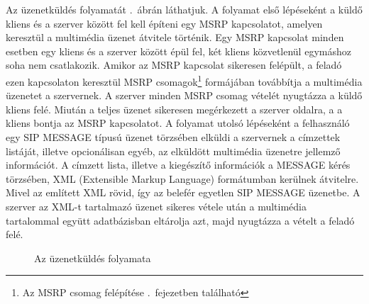 Az üzenetküldés folyamatát .~ábrán láthatjuk. A folyamat első lépéseként a küldő kliens és a szerver között fel kell építeni egy MSRP kapcsolatot, amelyen keresztül a multimédia üzenet átvitele történik. Egy MSRP kapcsolat minden esetben egy kliens és a szerver között épül fel, két kliens közvetlenül egymáshoz soha nem csatlakozik. Amikor az MSRP kapcsolat sikeresen felépült, a feladó ezen kapcsolaton keresztül MSRP csomagok\footnote{Az MSRP csomag felépítése .~fejezetben található} formájában továbbítja a multimédia üzenetet a szervernek. A szerver minden MSRP csomag vételét nyugtázza a küldő kliens felé. Miután a teljes üzenet sikeresen megérkezett a szerver oldalra, a a kliens bontja az MSRP kapcsolatot. A folyamat utolsó lépéseként a felhasználó egy SIP MESSAGE típusú üzenet törzsében elküldi a szervernek a címzettek listáját, illetve opcionálisan egyéb, az elküldött multimédia üzenetre jellemző információt. A címzett lista, illetve a kiegészítő információk a MESSAGE kérés törzsében, XML (Extensible Markup Language) formátumban kerülnek átvitelre. Mivel az említett XML rövid, így az belefér egyetlen SIP MESSAGE üzenetbe. A szerver az XML-t tartalmazó üzenet sikeres vétele után a multimédia tartalommal együtt adatbázisban eltárolja azt, majd nyugtázza a vételt a feladó felé.

\begin{figure}[htbp]
\center
{}
\caption{Az üzenetküldés folyamata}
\label{fig:sending_proc}
\end{figure}

